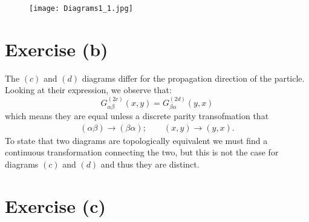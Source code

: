 \documentclass[a4paper]{article}
\begin{document}
\begin{figure}[h]
\centering
\label{fig:diagabcd}
\texttt{[image: Diagrams1\_1.jpg]}
\end{figure}

\section*{Exercise (b)}

The $(c)$ and $(d)$ diagrams differ for the propagation direction of the particle.
Looking at their expression, we observe that:
\begin{equation*}
G^{(2c)}_{\alpha\beta}(x,y)  = G^{(2d)}_{\beta\alpha}(y,x)
\end{equation*}
which means they are equal unless a discrete parity transofmation that
\begin{align*}
(\alpha\beta)\rightarrow (\beta\alpha);\qquad (x,y)\rightarrow (y,x). 
\end{align*}
To state that two diagrams are topologically equivalent we must find a continuous transformation connecting the two, but this is not the case for diagrams $(c)$ and $(d)$ and thus they are distinct.

\section*{Exercise (c)}
\end{document}
